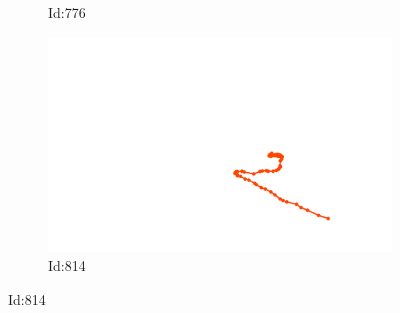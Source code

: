 \documentclass[12pt,twoside]{report}
\begin{document}
\begin{figure}
\begin{subfigure}[b]{0.20\textwidth}
\caption{Id:776}
\end{subfigure}
\begin{subfigure}[b]{0.20\textwidth}
\centering
\includegraphics[width=\textwidth]{../../trajectories/814.png}
\caption{Id:814}
\end{subfigure}
\end{figure}
\end{document}
